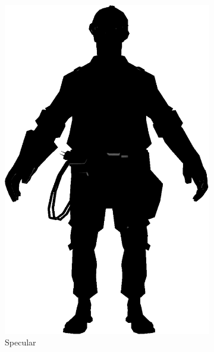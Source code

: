 \begin{figure}[h]
\begin{subfigure}[b]{0.16\textwidth}
        \includegraphics[width=\textwidth]{img/Lighting/specular.png}
        \caption{Specular}
        \label{fig:specular}
    \end{subfigure}
    ~
    \centering
    \begin{subfigure}[b]{0.16\textwidth}

\end{subfigure}
\end{figure}
